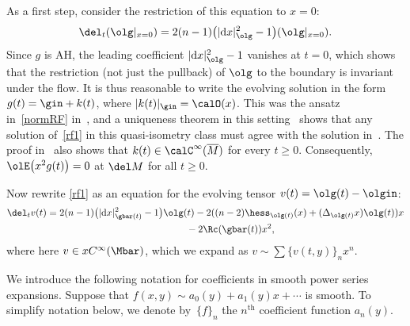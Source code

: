 As a first step, consider the restriction of this equation to $x = 0$:
\begin{gather*}%
 \del_t (\olg |_{x=0} ) = 2(n-1) \big( |{\rm d}x|_{\olg}^2 - 1\big) (\olg |_{x=0} ) .
\end{gather*}
Since $g$ is AH, the leading coefficient $|{\rm d}x|^2_{\olg} - 1$ vanishes at $t=0$, which shows that the restriction (not just the
pullback) of $\olg$ to the boundary is invariant under the flow. It is thus reasonable to write the evolving solution
in the form $g(t) = \gin + k(t)$, where $|k(t)|_{\gin} = \calO(x)$. This was the ansatz in~\eqref{normRF} in~\cite{Bahuaud}, and
a uniqueness theorem in this setting~\cite{Chen-Zhu} shows that any solution of~\eqref{rf1} in this quasi-isometry class
must agree with the solution in~\cite{Bahuaud}. The proof in~\cite{Bahuaud} also shows that $k(t) \in \calC^\infty(\overline{M})$
for every $t \geq 0$. Consequently, $\olE\big( x^2 g(t)\big) = 0 $ at $\del M$ for all $t \geq 0$.

Now rewrite \eqref{rf1} as an equation for the evolving tensor $v(t) = \olg(t) - \olgin$:
\begin{gather}
 \del_t v(t) = 2 (n-1) \big(|{\rm d}x|^2_{\gbar(t)} -1\big) \olg(t) -2 ( (n-2) \hess_{\olg(t)} (x) + (\Delta_{\olg(t)} x) \olg(t) ) x\nonumber\\
\hphantom{\del_t v(t) =}{} -2 \Rc(\gbar(t)) x^2, \label{rf2}
\end{gather}
where here $v \in x C^{\infty}(\Mbar)$, which we expand as $v \sim \sum \{ v(t,y) \}_n x^n$.

We introduce the following notation for coefficients in smooth power series expansions. Suppose that $f(x,y) \sim a_0(y) + a_1(y) x + \cdots$ is smooth. To simplify notation below, we denote by~$\{f\}_{n}$ the $n^{\mathrm{th}}$ coefficient function $a_n(y)$.

